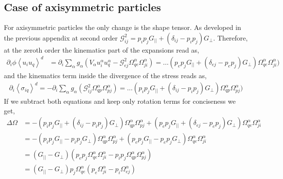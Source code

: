 {\subsection{Case of axisymmetric particles}

For axisymmetric particles the only change is the shape tensor.
As developed in the previous appendix at second order $\mathcal{G}^2_{ij} = p_ip_j G_{||} + (\delta_{ij} - p_ip_j) G_{\bot}$.
Therefore, at the zeroth order the kinematics   part of the expansions read as,
\begin{align}
    \partial_{i} \phi \left< u_{i} u_q\right>^d
    &=
    \partial_{i}
    \sum_\alpha  g_\alpha
    \left(
        V_\alpha u^\alpha_{i} u^\alpha_q
        -\mathcal{G}_{ej}^{2}\Omega_{qe}^\alpha \Omega_{ji}^\alpha
    \right)
    = \ldots
    (p_ep_j G_{||} + (\delta_{ej} - p_ep_j)G_{\bot})\Omega_{qe}^\alpha \Omega_{ji}^\alpha)
\end{align}
and the kinematics   term inside the divergence of the stress reads as,
\begin{align}
    \partial_i \left<\sigma_{iq}\right>^d =
    -\partial_{i}
    \sum_{\alpha}
    g_{\alpha}
    (\mathcal{G}_{ij}^{2}\Omega_{qp}^\alpha \Omega_{pj}^\alpha )
    =\ldots
    (p_ip_j G_{||} + (\delta_{ij} - p_ip_j) G_{\bot})\Omega_{qp}^\alpha \Omega_{pj}^\alpha)
\end{align}
If we subtract both equations and keep only rotation terms for conciseness we get,
\begin{align}
    \Delta \Omega
    &= - (p_ip_j G_{||} + (\delta_{ij} - p_ip_j) G_{\bot})\Omega_{qp}^\alpha \Omega_{pj}^\alpha
    + (p_ep_j G_{||} + (\delta_{ej} - p_ep_j)G_{\bot})\Omega_{qe}^\alpha \Omega_{ji}^\alpha\\
    &=- (p_ip_j G_{||} - p_ip_j  G_{\bot})\Omega_{qp}^\alpha \Omega_{pj}^\alpha
    + (p_ep_j G_{||} - p_ep_j G_{\bot})\Omega_{qe}^\alpha \Omega_{ji}^\alpha\\
    &= (G_{||} - G_{\bot})
    (p_ep_j\Omega_{qe}^\alpha \Omega_{ji}^\alpha
    - p_ip_j \Omega_{qp}^\alpha \Omega_{pj}^\alpha)\\
    &= (G_{||} - G_{\bot}) p_j \Omega_{qe}^\alpha
    (p_e \Omega_{ji}^\alpha
    - p_i \Omega_{ej}^\alpha)\\

\end{align}}
